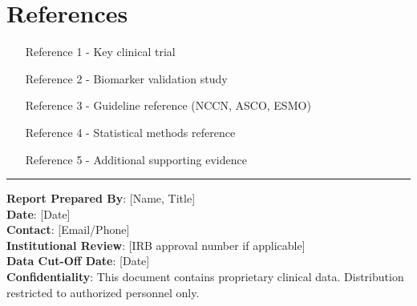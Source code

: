 \documentclass[10pt,letterpaper]{article}
\begin{document}
\section{References}

\begin{enumerate}
\item [Reference 1 - Key clinical trial]
\item [Reference 2 - Biomarker validation study]
\item [Reference 3 - Guideline reference (NCCN, ASCO, ESMO)]
\item [Reference 4 - Statistical methods reference]
\item [Reference 5 - Additional supporting evidence]
\end{enumerate}

\vspace{10pt}

\hrule
\vspace{4pt}
{\footnotesize
\textbf{Report Prepared By}: [Name, Title]\\
\textbf{Date}: [Date]\\
\textbf{Contact}: [Email/Phone]\\
\textbf{Institutional Review}: [IRB approval number if applicable]\\
\textbf{Data Cut-Off Date}: [Date]\\
\textbf{Confidentiality}: This document contains proprietary clinical data. Distribution restricted to authorized personnel only.
}
\end{document}
